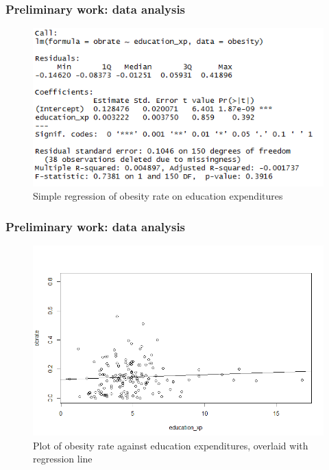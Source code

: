 \documentclass{beamer}
\begin{document}
\begin{frame}
\frametitle{Preliminary work: data analysis}
\begin{figure}
\label{fig:simreg}
\caption{Simple regression of obesity rate on education expenditures}
\centering
\includegraphics{edu_regression.PNG}
\end{figure}
\end{frame}

\begin{frame}
\frametitle{Preliminary work: data analysis}
\begin{figure}
\label{fig:edu_xp}
\caption{Plot of obesity rate against education expenditures, overlaid with regression line}
\includegraphics[scale=0.6]{edu_plot.PNG}
\end{figure}
\end{frame}
\end{document}
